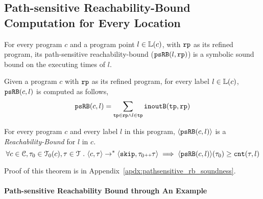\subsection{Path-sensitive Reachability-Bound Computation for Every Location}
\label{sec:pathsensitive_rb-psrbcompute}
For every program $c$ and a program point $l \in \mathbb{L}(c)$, with $\mathtt{rp}$ as its refined program,
its path-sensitive reachability-bound ($\mathtt{psRB}(l, \mathtt{rp})$) is a symbolic sound bound on the executing times of $l$.
%
 \begin{defn}
  \label{def:label_psrb}
Given a program $c$ with $\mathtt{rp}$ as its refined program,
for every label $l \in \mathbb{L}(c)$, $\mathtt{psRB}(c, l)$ is computed as follows,
\[ 
  \mathtt{psRB}(c, l) = \sum\limits_{\mathtt{tp} \in \mathtt{rp} \land 
l \in \mathtt{tp}} \mathtt{inoutB}(\mathtt{tp}, \mathtt{rp})
\]
 \end{defn}
 \begin{thm}
  \label{thm:pathsensitive_rb_soundness}
For every program ${c}$ and every label $l$ in this program,
$\langle \mathtt{psRB}(c, l) \rangle$ is a \emph{Reachability-Bound} for $l$ in $c$.
%
\[
  \forall c \in \mathcal{C}, \mathtt{\tau}_0 \in \mathcal{T}_0(c), \mathtt{\tau} \in \mathcal{T} ~.~ 
  \langle {c}, \mathtt{\tau} \rangle \to^{*} \langle \mathtt{skip}, \mathtt{\tau}_0 {\scriptscriptstyle ++} \mathtt{\tau} \rangle 
  \implies \langle \mathtt{psRB}(c, l) \rangle(\mathtt{\tau}_0) \geq \mathtt{cnt}(\mathtt{\tau}, l) 
  \]
\end{thm}
%
%
Proof of this theorem is in Appendix~\ref{apdx:pathsensitive_rb_soundness}.
\paragraph{Path-sensitive Reachability Bound through An Example}
